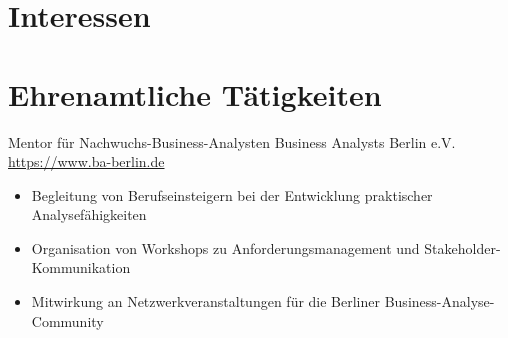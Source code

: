 \documentclass[a4paper, serif, 10pt]{moderncv}
\begin{document}
\section{Interessen}

\section{Ehrenamtliche Tätigkeiten}

        {Mentor für Nachwuchs-Business-Analysten}
        {Business Analysts Berlin e.V.}
        {\url{https://www.ba-berlin.de}}
        {}
        {\begin{itemize}
\item Begleitung von Berufseinsteigern bei der Entwicklung praktischer Analysefähigkeiten
\item Organisation von Workshops zu Anforderungsmanagement und Stakeholder-Kommunikation
\item Mitwirkung an Netzwerkveranstaltungen für die Berliner Business-Analyse-Community
\end{itemize}}
    
\end{document}
